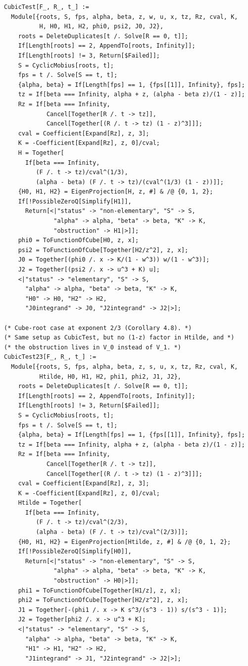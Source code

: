 \documentclass[11pt,a4paper]{article}
\theoremstyle{plain}
\theoremstyle{definition}
\theoremstyle{remark}
\begin{document}
\begin{lstlisting}
CubicTest[F_, R_, t_] :=
  Module[{roots, S, fps, alpha, beta, z, w, u, x, tz, Rz, cval, K,
          H, H0, H1, H2, phi0, psi2, J0, J2},
    roots = DeleteDuplicates[t /. Solve[R == 0, t]];
    If[Length[roots] == 2, AppendTo[roots, Infinity]];
    If[Length[roots] != 3, Return[$Failed]];
    S = CyclicMobius[roots, t];
    fps = t /. Solve[S == t, t];
    {alpha, beta} = If[Length[fps] == 1, {fps[[1]], Infinity}, fps];
    tz = If[beta === Infinity, alpha + z, (alpha - beta z)/(1 - z)];
    Rz = If[beta === Infinity,
            Cancel[Together[R /. t -> tz]],
            Cancel[Together[(R /. t -> tz) (1 - z)^3]]];
    cval = Coefficient[Expand[Rz], z, 3];
    K = -Coefficient[Expand[Rz], z, 0]/cval;
    H = Together[
      If[beta === Infinity,
         (F /. t -> tz)/cval^(1/3),
         (alpha - beta) (F /. t -> tz)/(cval^(1/3) (1 - z))]];
    {H0, H1, H2} = EigenProjection[H, z, #] & /@ {0, 1, 2};
    If[!PossibleZeroQ[Simplify[H1]],
      Return[<|"status" -> "non-elementary", "S" -> S,
              "alpha" -> alpha, "beta" -> beta, "K" -> K,
              "obstruction" -> H1|>]];
    phi0 = ToFunctionOfCube[H0, z, x];
    psi2 = ToFunctionOfCube[Together[H2/z^2], z, x];
    J0 = Together[(phi0 /. x -> K/(1 - w^3)) w/(1 - w^3)];
    J2 = Together[(psi2 /. x -> u^3 + K) u];
    <|"status" -> "elementary", "S" -> S,
      "alpha" -> alpha, "beta" -> beta, "K" -> K,
      "H0" -> H0, "H2" -> H2,
      "J0integrand" -> J0, "J2integrand" -> J2|>];

(* Cube-root case at exponent 2/3 (Corollary 4.8). *)
(* Same setup as CubicTest, but no (1-z) factor in Htilde, and *)
(* the obstruction lives in V_0 instead of V_1. *)
CubicTest23[F_, R_, t_] :=
  Module[{roots, S, fps, alpha, beta, z, s, u, x, tz, Rz, cval, K,
          Htilde, H0, H1, H2, phi1, phi2, J1, J2},
    roots = DeleteDuplicates[t /. Solve[R == 0, t]];
    If[Length[roots] == 2, AppendTo[roots, Infinity]];
    If[Length[roots] != 3, Return[$Failed]];
    S = CyclicMobius[roots, t];
    fps = t /. Solve[S == t, t];
    {alpha, beta} = If[Length[fps] == 1, {fps[[1]], Infinity}, fps];
    tz = If[beta === Infinity, alpha + z, (alpha - beta z)/(1 - z)];
    Rz = If[beta === Infinity,
            Cancel[Together[R /. t -> tz]],
            Cancel[Together[(R /. t -> tz) (1 - z)^3]]];
    cval = Coefficient[Expand[Rz], z, 3];
    K = -Coefficient[Expand[Rz], z, 0]/cval;
    Htilde = Together[
      If[beta === Infinity,
         (F /. t -> tz)/cval^(2/3),
         (alpha - beta) (F /. t -> tz)/cval^(2/3)]];
    {H0, H1, H2} = EigenProjection[Htilde, z, #] & /@ {0, 1, 2};
    If[!PossibleZeroQ[Simplify[H0]],
      Return[<|"status" -> "non-elementary", "S" -> S,
              "alpha" -> alpha, "beta" -> beta, "K" -> K,
              "obstruction" -> H0|>]];
    phi1 = ToFunctionOfCube[Together[H1/z], z, x];
    phi2 = ToFunctionOfCube[Together[H2/z^2], z, x];
    J1 = Together[-(phi1 /. x -> K s^3/(s^3 - 1)) s/(s^3 - 1)];
    J2 = Together[phi2 /. x -> u^3 + K];
    <|"status" -> "elementary", "S" -> S,
      "alpha" -> alpha, "beta" -> beta, "K" -> K,
      "H1" -> H1, "H2" -> H2,
      "J1integrand" -> J1, "J2integrand" -> J2|>];


\end{lstlisting}
\end{document}
